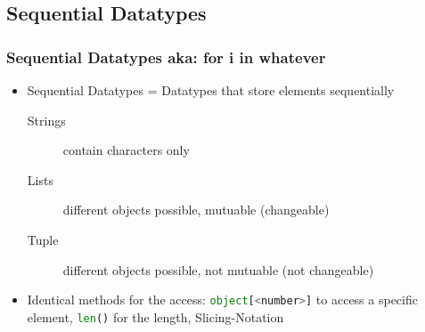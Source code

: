 \documentclass[english]{beamer}
\begin{document}
\subsection{Sequential Datatypes}

\begin{frame}
\frametitle{Sequential Datatypes aka: for i in whatever}

\begin{itemize}
\item Sequential Datatypes = Datatypes that store elements sequentially

\begin{description}
\item[Strings] contain characters only
\item[Lists] different objects possible, mutuable (changeable)
\item[Tuple] different objects possible, not mutuable \newline (not changeable)
\end{description}
\item Identical methods for the access: \lstinline[language={Python}]{object[<number>]} to access a specific element, \lstinline[language={Python}]{len()} for the length, Slicing-Notation
\end{itemize}
\end{frame}

%
%
%
%
%
%
\end{document}
